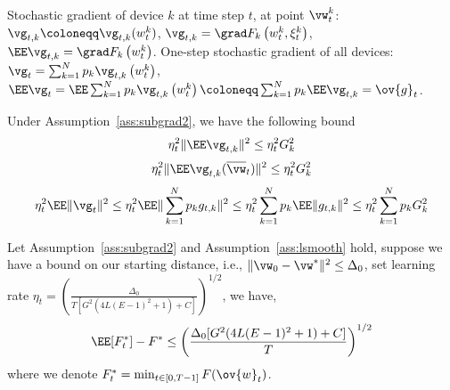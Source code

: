 
Stochastic gradient of device $k$ at time step $t$, at point $\vw_t^k$: 
	$\vg_{t,k} \coloneqq \vg_{t,k}(w_t^k)$,
	$ \vg_{t, k} = \grad F_{k}\left(w_{t}^{k}, \xi_{t}^{k}\right) $,
	$\EE \vg_{t, k} = \grad F_{k}\left(w_{t}^{k}\right)$.
One-step stochastic gradient of all devices:
$\vg_{t}=\sum_{k=1}^{N} p_{k} \vg_{t, k}\left(w_{t}^{k}\right) $, $\EE \vg_{t}= \EE \sum_{k=1}^{N} p_{k} \vg_{t, k}\left(w_{t}^{k}\right) \coloneqq \sum_{k=1}^{N} p_{k} \EE \vg_{t, k} = \ov{g}_t$.

\begin{lemma}
Under Assumption~\ref{ass:subgrad2}, we have the following bound
\begin{equation}
	\eta_t^2 \|\EE \vg_{t,k}\|^2 \leq  \eta_t^2 G_k^2
	\label{eq:g3}
\end{equation}
\begin{equation}
	\eta_t^2 \|\EE \vg_{t,k}(\overline{\vw}_t)\|^2 \leq  \eta_t^2 G_k^2
	\label{eq:g2}
\end{equation}
\begin{align}
	  \eta_{t}^{2} \EE\| \vg_{t} \|^{2} 
	\leq   \eta_{t}^{2} \EE\| \sum_{k=1}^N p_k g_{t,k} \|^{2} 
	\leq   \eta_{t}^{2} \sum_{k=1}^N p_k \EE\| g_{t,k} \|^{2} 
	\leq   \eta_{t}^{2} \sum_{k=1}^N p_k G_k^2  \label{eq:g1}
\end{align}
\label{lma:gradient}
\end{lemma}



\begin{theorem}
Let Assumption~\ref{ass:subgrad2} and Assumption~\ref{ass:lsmooth} hold, suppose we have a bound 
on our starting distance, i.e., $\|\vw_{0} - \vw^*\|^2 \leq \Delta_0$, set learning rate $\eta_t =  \left(\frac{\Delta_0}{ T [G^2( 4L(E-1)^2 + 1) + C]}\right)^{1/2}$, we have,
$$\EE[ F_t^*] - F^*  \leq \left(\frac{ \Delta_0 [G^2( 4L(E-1)^2 + 1) + C] }{T}\right)^{1/2}$$
where we denote $F^*_t = \min_{t \in [0, T-1]} F(\ov{w}_t)$.
\end{theorem}

